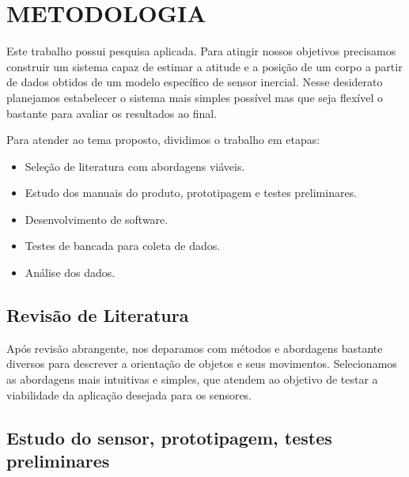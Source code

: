 \chapter{METODOLOGIA}\label{chap:metodologia}

Este trabalho possui pesquisa aplicada. Para atingir nossos objetivos precisamos construir um sistema capaz de estimar a atitude e a posição de um corpo a partir de dados obtidos de um modelo específico de sensor inercial. Nesse desiderato planejamos estabelecer o sistema mais simples possível mas que seja flexível o bastante para avaliar os resultados ao final.

Para atender ao tema proposto, dividimos o trabalho em etapas:
\begin{itemize}
    \item Seleção de literatura com abordagens viáveis.
    \item Estudo dos manuais do produto, prototipagem e testes preliminares.
    \item Desenvolvimento de software.
    \item Testes de bancada para coleta de dados.
    \item Análise dos dados.
\end{itemize}

\section{Revisão de Literatura}

Após revisão abrangente, nos deparamos com métodos e abordagens bastante diversos para descrever a orientação de objetos e seus movimentos. Selecionamos as abordagens mais intuitivas e simples, que atendem ao objetivo de testar a viabilidade da aplicação desejada para os sensores. 

\section{Estudo do sensor, prototipagem, testes preliminares}

